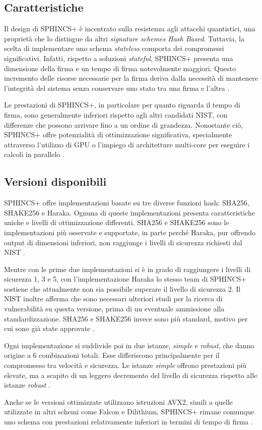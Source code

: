 \subsection{Caratteristiche}

Il design di SPHINCS+ è incentrato sulla resistenza agli attacchi quantistici, una proprietà che lo distingue da altri \textit{signature schemes Hash Based}. Tuttavia, la scelta di implementare uno schema \textit{stateless} comporta dei compromessi significativi. Infatti, rispetto a soluzioni \textit{stateful}, SPHINCS+ presenta una dimensione della firma e un tempo di firma notevolmente maggiori. Questo incremento delle risorse necessarie per la firma deriva dalla necessità di mantenere l'integrità del sistema senza conservare uno stato tra una firma e l'altra \cite{NISTthirdReport}.

Le prestazioni di SPHINCS+, in particolare per quanto riguarda il tempo di firma, sono generalmente inferiori rispetto agli altri candidati NIST, con differenze che possono arrivare fino a un ordine di grandezza. Nonostante ciò, SPHINCS+ offre potenzialità di ottimizzazione significativa, specialmente attraverso l'utilizzo di GPU o l'impiego di architetture multi-core per eseguire i calcoli in parallelo \cite{sphincs-ieee-paper}.

\subsection{Versioni disponibili}

SPHINCS+ offre implementazioni basate su tre diverse funzioni hash: SHA256, SHAKE256 e Haraka. Ognuna di queste implementazioni presenta caratteristiche uniche e livelli di ottimizzazione differenti. SHA256 e SHAKE256 sono le implementazioni più osservate e supportate, in parte perché Haraka, pur offrendo output di dimensioni inferiori, non raggiunge i livelli di sicurezza richiesti dal NIST \cite{sphincs-submissionpackage-three}.

Mentre con le prime due implementazioni si è in grado di raggiungere i livelli di sicurezza 1, 3 e 5, con l'implementazione Haraka lo stesso team di SPHINCS+ sostiene che attualmente non sia possibile superare il livello di sicurezza 2. Il NIST inoltre afferma che sono necessari ulteriori studi per la ricerca di vulnerabilità su questa versione, prima di un eventuale ammissione alla standardizzazione. SHA256 e SHAKE256 invece sono più standard, motivo per cui sono già state approvate \cite{sphincs-submissionpackage-three}.

Ogni implementazione si suddivide poi in due istanze, \textit{simple} e \textit{robust}, che danno origine a 6 combinazioni totali. Esse differiscono principalmente per il compromesso tra velocità e sicurezza. Le istanze \textit{simple} offrono prestazioni più elevate, ma a scapito di un leggero decremento del livello di sicurezza rispetto alle istanze \textit{robust} \cite{sphincs-submissionpackage-three}.

Anche se le versioni ottimizzate utilizzano istruzioni AVX2, simili a quelle utilizzate in altri schemi come Falcon e Dilithium, SPHINCS+ rimane comunque uno schema con prestazioni relativamente inferiori in termini di tempo di firma \cite{NISTthirdReport}.